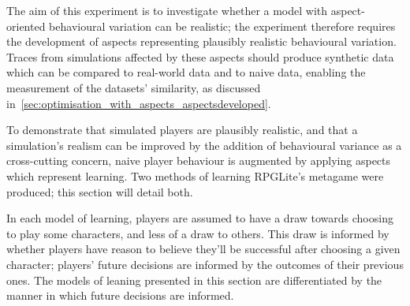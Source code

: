 

The aim of this experiment is to investigate whether a model with
aspect-oriented behavioural variation can be realistic; the experiment therefore
requires the development of aspects representing plausibly realistic behavioural
variation. Traces from simulations affected by these aspects should produce
synthetic data which can be compared to real-world data and to naive data,
enabling the measurement of the datasets' similarity, as discussed
in~\cref{sec:optimisation_with_aspects_aspectsdeveloped}. 

To demonstrate that simulated players are plausibly realistic, and
that a simulation's realism can be improved by the addition of behavioural
variance as a cross-cutting concern, naive player behaviour is augmented by
applying aspects which represent learning. Two methods of learning RPGLite's
metagame were produced; this section will detail both.

In each model of learning, players are assumed to have a draw towards choosing
to play some characters, and less of a draw to others. This draw is informed by
whether players have reason to believe they'll be successful after choosing a
given character; players' future decisions are informed by the outcomes of their
previous ones. The models of leaning presented in this section are
differentiated by the manner in which future decisions are informed.








